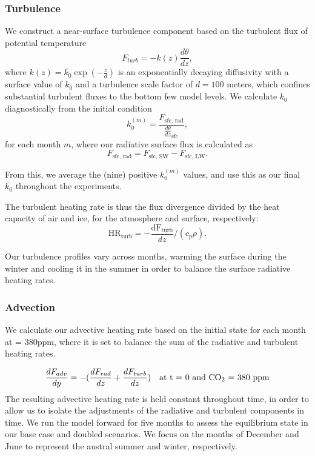 \documentclass[12]{article}
\begin{document}
\subsubsection{Turbulence}
We construct a near-surface turbulence component based on the turbulent flux of potential temperature
\begin{equation}
    F_{turb} = -k(z) \frac{d\theta}{dz},
\end{equation}
where $k(z) = \overline{k_0} \exp(-\frac{z}{d})$ is an exponentially decaying diffusivity with a surface value of $k_0$ and a turbulence scale factor of $d = 100$ meters, which confines substantial turbulent fluxes to the bottom few model levels. We calculate $k_0$ diagnostically from the initial condition
\begin{equation}
    k_0^{(m)} = \frac{F_{\text{sfc, rad}}}{\frac{d\theta}{dz}_{\text{sfc}}},
\end{equation}
for each month $m$, where our radiative surface flux is calculated as
\begin{equation}
    F_{\text{sfc, rad}} = F_{\text{sfc, SW}} - F_{\text{sfc, LW}}.
\end{equation}

From this, we average the (nine) positive $k_0^{(m)}$ values, and use this as our final $\overline{k_0}$ throughout the experiments.

The turbulent heating rate is thus the flux divergence divided by the heat capacity of air and ice, for the atmosphere and surface, respectively:
\begin{equation}
    \text{HR}_{\text{turb}} = -\frac{\text{dF}_{\text{turb}}}{dz} /(c_p \rho).
\end{equation}

Our turbulence profiles vary across months, warming the surface during the winter and cooling it in the summer in order to balance the surface radiative heating rates.

\subsubsection{Advection}
We calculate our advective heating rate based on the initial state for each month at  = 380ppm, where it is set to balance the sum of the radiative and turbulent heating rates.

\begin{equation}
    \frac{dF_{adv}}{dy} = -(\frac{dF_{rad}}{dz} + \frac{dF_{turb}}{dz})\quad \text{at t = 0 and \ce{CO_2} = 380 ppm}
\end{equation}
The resulting advective heating rate is held constant throughout time, in order to allow us to isolate the adjustments of the radiative and turbulent components in time. 
We run the model forward for five months to assess the equilibrium state in our base case and doubled  scenarios. We focus on the months of December and June to represent the austral summer and winter, respectively.
\end{document}

